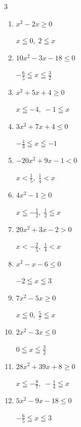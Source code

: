 \begin{multicols}{3}
\begin{enumerate}
        $\displaystyle x < -\frac{6}{7} , \; 4 < x$

  \item $x^{2}-2x\geq 0$

        $\displaystyle x \leqq 0 , \; 2 \leqq x$

  \item $10x^{2}-3x-18\leq 0$

        $\displaystyle -\frac{6}{5} \leqq x \leqq \frac{3}{2}$

  \item $x^{2}+5x+4\geq 0$

        $\displaystyle x \leqq -4 , \; -1 \leqq x$

  \item $3x^{2}+7x+4\leq 0$

        $\displaystyle -\frac{4}{3} \leqq x \leqq -1$

  \item $-20x^{2}+9x-1<0$

        $\displaystyle x < \frac{1}{5} , \; \frac{1}{4} < x$

  \item $4x^{2}-1\geq 0$

        $\displaystyle x \leqq -\frac{1}{2} , \; \frac{1}{2} \leqq x$

\columnbreak %

  \item $20x^{2}+3x-2>0$

        $\displaystyle x < -\frac{2}{5} , \; \frac{1}{4} < x$

  \item $x^{2}-x-6\leq 0$

        $\displaystyle -2 \leqq x \leqq 3$

  \item $7x^{2}-5x\geq 0$

        $\displaystyle x \leqq 0 , \; \frac{5}{7} \leqq x$

  \item $2x^{2}-3x\leq 0$

        $\displaystyle 0 \leqq x \leqq \frac{3}{2}$

  \item $28x^{2}+39x+8\geq 0$

        $\displaystyle x \leqq -\frac{8}{7} , \; -\frac{1}{4} \leqq x$

  \item $5x^{2}-9x-18\leq 0$

        $\displaystyle -\frac{6}{5} \leqq x \leqq 3$


\end{enumerate}
\end{multicols}
